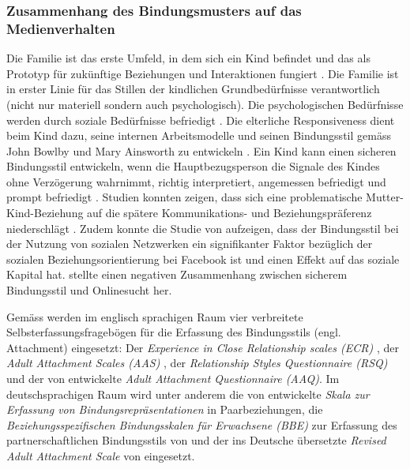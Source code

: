 \subsubsection{Zusammenhang des Bindungsmusters auf das Medienverhalten} 
Die Familie ist das erste Umfeld, in dem sich ein Kind befindet  und das als Prototyp für zukünftige Beziehungen und Interaktionen fungiert \cite{Floros2013}. Die Familie ist in erster Linie für das Stillen der kindlichen Grundbedürfnisse verantwortlich (nicht nur materiell sondern auch psychologisch). Die psychologischen Bedürfnisse werden durch soziale Bedürfnisse befriedigt \cite{Hazan1994}. Die elterliche Responsiveness dient beim Kind dazu, seine internen Arbeitsmodelle und seinen Bindungsstil gemäss John Bowlby \cite{Bowlby1969} und Mary Ainsworth \cite{Bell1972} zu entwickeln \cite{Bretherton1999}. Ein Kind kann einen sicheren Bindungsstil entwickeln, wenn die Hauptbezugsperson die Signale des Kindes ohne Verzögerung wahrnimmt, richtig interpretiert, angemessen befriedigt und prompt befriedigt \cite{Bell1972}. Studien konnten zeigen, dass sich eine problematische Mutter-Kind-Beziehung auf die spätere Kommunikations- und Beziehungspräferenz niederschlägt \cite{Szwedo2011}. Zudem konnte die Studie von  aufzeigen, dass der Bindungsstil bei der Nutzung von sozialen Netzwerken ein signifikanter Faktor bezüglich der sozialen Beziehungsorientierung bei Facebook ist und einen Effekt auf das soziale Kapital hat.  stellte einen negativen Zusammenhang zwischen sicherem Bindungsstil und Onlinesucht her.  

Gemäss  werden im englisch sprachigen Raum vier verbreitete Selbsterfassungsfragebögen für die Erfassung des Bindungsstils (engl. Attachment) eingesetzt: Der \textit{
Experience in Close Relationship scales (ECR)} \cite{Brennan1998}, der \textit{Adult Attachment Scales (AAS)} \cite{Collins1990}, der \textit{Relationship Styles Questionnaire (RSQ)} \cite{Griffin1994} und der von  entwickelte \textit{Adult Attachment Questionnaire (AAQ)}. Im deutschsprachigen Raum wird unter anderem die von  entwickelte \textit{Skala zur Erfassung von Bindungsrepräsentationen} in Paarbeziehungen, die \textit{Beziehungsspezifischen Bindungsskalen für Erwachsene (BBE)} zur Erfassung des partnerschaftlichen Bindungsstils von  und der ins Deutsche übersetzte \textit{Revised Adult Attachment Scale} von  eingesetzt. 

